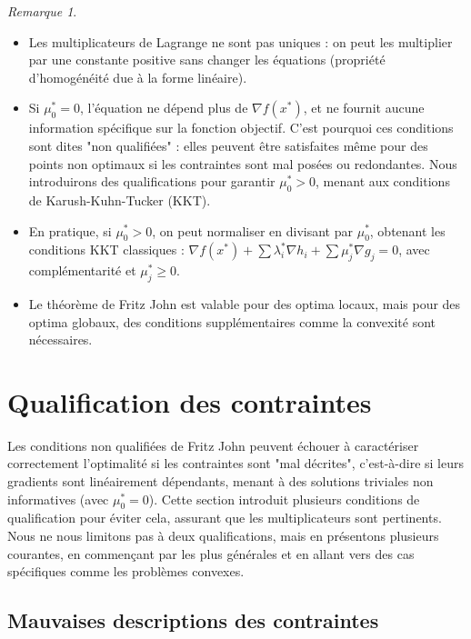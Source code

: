 \documentclass[a4paper,12pt,openany]{book}
\theoremstyle{plain}
\theoremstyle{definition}
\theoremstyle{remark}
\newtheorem{remark}[theorem]{Remarque}
\theoremstyle{nbstyle}
\begin{document}
	\begin{remark}
		\begin{itemize}
			\item Les multiplicateurs de Lagrange ne sont pas uniques : on peut les multiplier par une constante positive sans changer les équations (propriété d'homogénéité due à la forme linéaire).
			\item Si \( \mu_0^* = 0 \), l'équation ne dépend plus de \( \nabla f(x^*) \), et ne fournit aucune information spécifique sur la fonction objectif. C'est pourquoi ces conditions sont dites "non qualifiées" : elles peuvent être satisfaites même pour des points non optimaux si les contraintes sont mal posées ou redondantes. Nous introduirons des qualifications pour garantir \( \mu_0^* > 0 \), menant aux conditions de Karush-Kuhn-Tucker (KKT).
			\item En pratique, si \( \mu_0^* > 0 \), on peut normaliser en divisant par \( \mu_0^* \), obtenant les conditions KKT classiques : \( \nabla f(x^*) + \sum \lambda_i^* \nabla h_i + \sum \mu_j^* \nabla g_j = 0 \), avec complémentarité et \( \mu_j^* \geq 0 \).
			\item Le théorème de Fritz John est valable pour des optima locaux, mais pour des optima globaux, des conditions supplémentaires comme la convexité sont nécessaires.
		\end{itemize}
	\end{remark}
	
	\section{Qualification des contraintes}
	
	Les conditions non qualifiées de Fritz John peuvent échouer à caractériser correctement l'optimalité si les contraintes sont "mal décrites", c'est-à-dire si leurs gradients sont linéairement dépendants, menant à des solutions triviales non informatives (avec \( \mu_0^* = 0 \)). Cette section introduit plusieurs conditions de qualification pour éviter cela, assurant que les multiplicateurs sont pertinents. Nous ne nous limitons pas à deux qualifications, mais en présentons plusieurs courantes, en commençant par les plus générales et en allant vers des cas spécifiques comme les problèmes convexes.
	
	\subsection{Mauvaises descriptions des contraintes}
	
\end{document}
